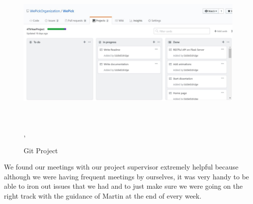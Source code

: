 \begin{figure}[ht]
\renewcommand\thefigure{3.1}
\centering
\includegraphics[width=14cm, height=8cm]{img/projectboard.JPG},
\caption{Git Project}
\label{Github Projects}
\end{figure}
\par
We found our meetings with our project supervisor extremely helpful because although we were having frequent meetings by ourselves, it was very handy to be able to iron out issues that we had and to just make sure we were going on the right track with the guidance of Martin at the end of every week.

